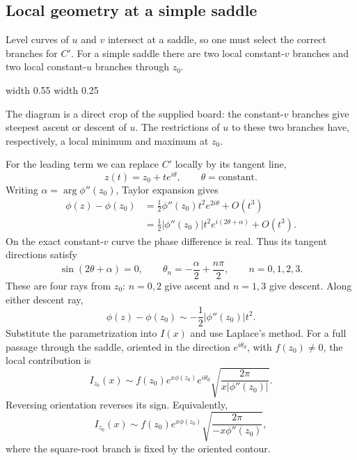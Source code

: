 \documentclass[11pt,a4paper]{article}
\begin{document}
\clearpage
\subsection*{Local geometry at a simple saddle}
Level curves of $u$ and $v$ intersect at a saddle, so one must select
the correct branches for $C'$. For a simple saddle there are two local
constant-$v$ branches and two local constant-$u$ branches through $z_0$.
\begin{center}
    \pdfximage width 0.55\linewidth {figures/asymptotic-lecture10/saddle-level-curves.png}
    \leavevmode\pdfrefximage\pdflastximage
    \hspace{0.03\linewidth}
    \pdfximage width 0.25\linewidth {figures/asymptotic-lecture10/restricted-extrema.png}
    \leavevmode\pdfrefximage\pdflastximage
\end{center}
\noindent The diagram is a direct crop of the supplied board: the
constant-$v$ branches give steepest ascent or descent of $u$.
The restrictions of $u$ to these two branches have, respectively,
a local minimum and maximum at $z_0$.

\medskip
For the leading term we can replace $C'$ locally by its tangent line,
\[
    z(t)=z_0+t e^{i\theta},\qquad \theta=\text{constant}.
\]
Writing $\alpha=\arg\phi''(z_0)$, Taylor expansion gives
\begin{align*}
    \phi(z)-\phi(z_0)
    &=\frac12\phi''(z_0)t^2e^{2i\theta}+O(t^3)\\
    &=\frac12|\phi''(z_0)|t^2e^{i(2\theta+\alpha)}+O(t^3).
\end{align*}
On the exact constant-$v$ curve the phase difference is real. Thus its
tangent directions satisfy
\[
    \sin(2\theta+\alpha)=0,
    \qquad \theta_n=-\frac\alpha2+\frac{n\pi}{2},
    \qquad n=0,1,2,3.
\]
These are four rays from $z_0$: $n=0,2$ give ascent and $n=1,3$
give descent. Along either descent ray,
\[
    \phi(z)-\phi(z_0)\sim-\frac12|\phi''(z_0)|t^2.
\]
Substitute the parametrization into $I(x)$ and use Laplace's method.
For a full passage through the saddle, oriented in the direction
$e^{i\theta_d}$, with $f(z_0)\neq0$, the local contribution is
\[
    I_{z_0}(x)\sim
    f(z_0)e^{x\phi(z_0)}e^{i\theta_d}
    \sqrt{\frac{2\pi}{x|\phi''(z_0)|}}.
\]
Reversing orientation reverses its sign. Equivalently,
\[
    I_{z_0}(x)\sim
    f(z_0)e^{x\phi(z_0)}
    \sqrt{\frac{2\pi}{-x\phi''(z_0)}},
\]
where the square-root branch is fixed by the oriented contour.

\clearpage
\end{document}
